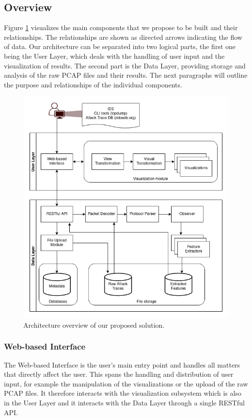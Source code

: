 \subsection{Overview}
Figure \ref{fig:architectureoverview} visualizes the main components that we propose to be built and their relationships. The relationships are shown as directed arrows indicating the flow of data. Our architecture can be separated into two logical parts, the first one being the User Layer, which deals with the handling of user input and the visualization of results. The second part is the Data Layer, providing storage and analysis of the raw PCAP files and their results. The next paragraphs will outline the purpose and relationships of the individual components.
\begin{figure}
    \centering
    \includegraphics[width=16cm]{images/Highlevel-approach.png}
    \caption{Architecture overview of our proposed solution.}
    \label{fig:architectureoverview}
\end{figure}

\subsubsection{Web-based Interface}
The Web-based Interface is the user's main entry point and handles all matters that directly affect the user. This spans the handling and distribution of user input, for example the manipulation of the visualizations or the upload of the raw PCAP files. It therefore interacts with the visualization subsystem which is also in the User Layer and it interacts with the Data Layer through a single RESTful API.

